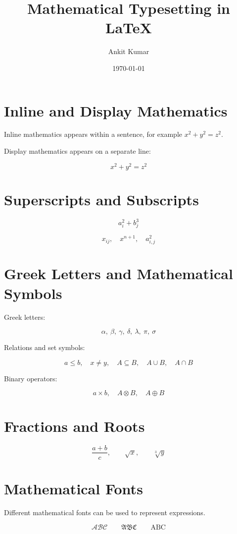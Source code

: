 \documentclass{article}
\title{Mathematical Typesetting in LaTeX}
\author{Ankit Kumar}
\date{\today}
\begin{document}
\maketitle

\section{Inline and Display Mathematics}

Inline mathematics appears within a sentence, for example
\(x^2 + y^2 = z^2\).

Display mathematics appears on a separate line:

\[
x^2 + y^2 = z^2
\]

\section{Superscripts and Subscripts}

\[
a_i^2 + b_j^3
\]

\[
x_{ij}, \quad x^{n+1}, \quad a_{i,j}^{2}
\]

\section{Greek Letters and Mathematical Symbols}

Greek letters:

\[
\alpha,\ \beta,\ \gamma,\ \delta,\ \lambda,\ \pi,\ \sigma
\]

Relations and set symbols:

\[
a \leq b,\quad x \neq y,\quad
A \subseteq B,\quad A \cup B,\quad A \cap B
\]

Binary operators:

\[
a \times b,\quad A \otimes B,\quad A \oplus B
\]

\section{Fractions and Roots}

\[
\frac{a+b}{c}, \qquad
\sqrt{x}, \qquad
\sqrt[3]{y}
\]

\section{Mathematical Fonts}

Different mathematical fonts can be used to represent expressions.

\[
\mathcal{ABC} \qquad
\mathfrak{ABC} \qquad
\mathrm{ABC}
\]
\end{document}
